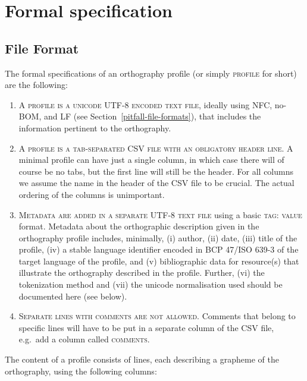 \section{Formal specification}
\label{formal-specification-of-orthography-profiles}

\subsection*{File Format}
The formal specifications of an orthography profile (or simply \textsc{profile}
for short) are the following:

\begin{enumerate}
	\def\labelenumi{A\arabic{enumi}.} 
	\item \textsc{A profile is a unicode UTF-8 encoded text file}, ideally
       using NFC, no-BOM, and LF (see Section~\ref{pitfall-file-formats}), that
       includes the information pertinent to the orthography. 
	\item \textsc{A profile is a tab-separated CSV file with an obligatory header
       line}. A minimal profile can have just a single column, in which case
       there will of course be no tabs, but the first line will still be the
       header. For all columns we assume the name in the header of the CSV file
       to be crucial. The actual ordering of the columns is unimportant. 
	\item \textsc{Metadata are added in a separate UTF-8 text file} using a basic
       \textsc{tag: value} format. Metadata about the orthographic description
       given in the orthography profile includes, minimally, (i) author, (ii)
       date, (iii) title of the profile, (iv) a stable language identifier
       encoded in BCP 47/ISO 639-3 of the target language of the profile, and (v)
       bibliographic data for resource(s) that illustrate the orthography
       described in the profile. Further, (vi) the tokenization method and (vii)
       the unicode normalisation used should be documented here (see below).
    	\item \textsc{Separate lines with comments are not allowed}. Comments that
       belong to specific lines will have to be put in a separate column of
       the CSV file, e.g.~add a column called \textsc{comments}.            
\end{enumerate}

\noindent The content of a profile consists of lines, each describing a grapheme
of the orthography, using the following columns:

